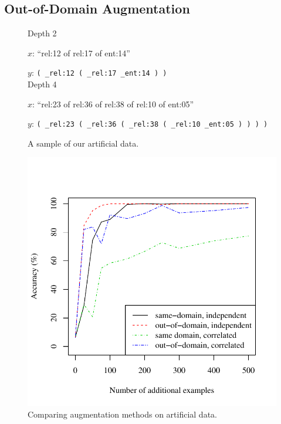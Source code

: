 \documentclass[11pt,letterpaper]{article}
\begin{document}
\subsection{Out-of-Domain Augmentation}
\begin{figure}[t] 
\small
\begin{framed}
\footnotesize
Depth 2

\quad $x$: ``rel:12 of rel:17 of ent:14''

\quad $y$: \texttt{( \_rel:12 ( \_rel:17 \_ent:14 ) )}\\
Depth 4

\quad $x$: ``rel:23 of rel:36 of rel:38 of rel:10 of ent:05''

\quad $y$: \texttt{( \_rel:23 ( \_rel:36 ( \_rel:38 ( \_rel:10 \_ent:05 ) ) ) )}

\end{framed}
\caption{A sample of our artificial data.}
\label{fig:artificial-data}
\end{figure}

\begin{figure}[t] 
\small
\begin{center} 
  \includegraphics[scale=0.65]{fig-artificial-aug.pdf}
\end{center} 
\caption{Comparing augmentation methods on artificial data.}
\label{fig:artificial}
\end{figure}
\end{document}
